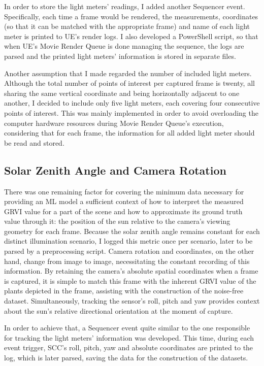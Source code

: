 In order to store the light meters' readings, I added another Sequencer event. Specifically, each time a frame would be rendered, the measurements, coordinates (so that it can be matched with the appropriate frame) and name of each light meter is printed to UE's render logs. I also developed a PowerShell script, so that when UE's Movie Render Queue is done managing the sequence, the logs are parsed and the printed light meters' information is stored in separate files.

Another assumption that I made regarded the number of included light meters. Although the total number of points of interest per captured frame is twenty, all sharing the same vertical coordinate and being horizontally adjacent to one another, I decided to include only five light meters, each covering four consecutive points of interest. This was mainly implemented in order to avoid overloading the computer hardware resources during Movie Render Queue's execution, considering that for each frame, the information for all added light meter should be read and stored.

\subsection{Solar Zenith Angle and Camera Rotation}

There was one remaining factor for covering the minimum data necessary for providing an ML model a sufficient context of how to interpret the measured GRVI value for a part of the scene and how to approximate its ground truth value through it: the position of the sun relative to the camera's viewing geometry for each frame. Because the solar zenith angle remains constant for each distinct illumination scenario, I logged this metric once per scenario, later to be parsed by a preprocessing script. Camera rotation and coordinates, on the other hand, change from image to image, necessitating the constant recording of this information. By retaining the camera's absolute spatial coordinates when a frame is captured, it is simple to match this frame with the inherent GRVI value of the plants depicted in the frame, assisting with the construction of the noise-free dataset. Simultaneously, tracking the sensor's roll, pitch and yaw provides context about the sun's relative directional orientation at the moment of capture.

In order to achieve that, a Sequencer event quite similar to the one responsible for tracking the light meters' information was developed. This time, during each event trigger, SCC's roll, pitch, yaw and absolute coordinates are printed to the log, which is later parsed, saving the data for the construction of the datasets.

